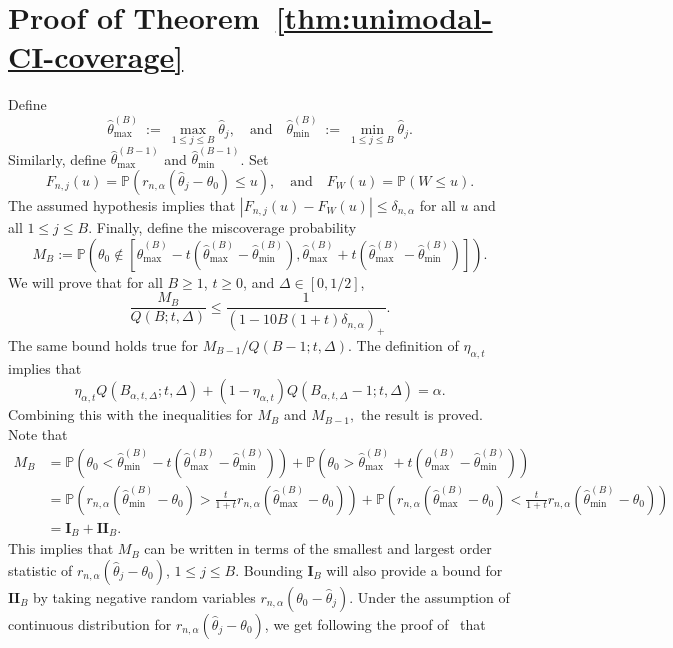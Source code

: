 \documentclass{article}
\numberwithin{myalgctr}{section}
\begin{document}
\section{Proof of Theorem~\ref{thm:unimodal-CI-coverage}}\label{appsec:unimodal-CI-coverage}
Define
\[
\widehat{\theta}_{\max}^{(B)} ~:=~ \max_{1\le j\le B}\widehat{\theta}_j,\quad\mbox{and}\quad \widehat{\theta}_{\min}^{(B)} ~:=~ \min_{1\le j\le B}\widehat{\theta}_j.
\]
Similarly, define $\widehat{\theta}_{\max}^{(B-1)}$ and $\widehat{\theta}_{\min}^{(B-1)}$.
Set
\[
F_{n,j}(u) = \mathbb{P}(r_{n,\alpha}(\widehat{\theta}_j - \theta_0) \le u),\quad\mbox{and}\quad F_W(u) = \mathbb{P}(W \le u).
\]
The assumed hypothesis implies that $|F_{n,j}(u) - F_W(u)| \le \delta_{n,\alpha}$ for all $u$ and all $1\le j\le B$. Finally, define the miscoverage probability
\[
M_B := \mathbb{P}\left(\theta_0 \notin \left[\widehat{\theta}_{\max}^{(B)} - t(\widehat{\theta}_{\max}^{(B)} - \widehat{\theta}_{\min}^{(B)}), \widehat{\theta}_{\max}^{(B)} + t(\widehat{\theta}_{\max}^{(B)} - \widehat{\theta}_{\min}^{(B)})\right]\right).
\]
We will prove that for all $B\ge1$, $t\ge0$, and $\Delta\in[0, 1/2]$,
\begin{equation}\label{eq:required-inequality-miscoverage-unimodal}
\frac{M_B}{Q(B; t, \Delta)} \le \frac{1}{(1 - 10B(1 + t)\delta_{n,\alpha})_+}.
\end{equation}
The same bound holds true for $M_{B-1}/Q(B-1;t, \Delta)$. The definition of $\eta_{\alpha,t}$ implies that $$\eta_{\alpha,t}Q(B_{\alpha,t,\Delta}; t, \Delta) + (1 - \eta_{\alpha,t})Q(B_{\alpha,t,\Delta}-1; t, \Delta) = \alpha.$$ Combining this with the inequalities for $M_B$ and $M_{B-1},$ the result is proved.
Note that
\begin{align*}
M_B &= \mathbb{P}(\theta_0 < \widehat{\theta}_{\min}^{(B)} - t (\widehat{\theta}_{\max}^{(B)} - \widehat{\theta}_{\min}^{(B)})) + \mathbb{P}(\theta_0 > \widehat{\theta}_{\max}^{(B)} + t (\widehat{\theta}_{\max}^{(B)} - \widehat{\theta}_{\min}^{(B)}))\\
&= \mathbb{P}\left(r_{n,\alpha}(\widehat{\theta}_{\min}^{(B)} - \theta_0) > \frac{t}{1+t}  r_{n,\alpha}(\widehat{\theta}_{\max}^{(B)} - \theta_0)\right) + \mathbb{P}\left(r_{n,\alpha}(\widehat{\theta}_{\max}^{(B)} - \theta_0) <  \frac{t}{1+t} r_{n,\alpha}(\widehat{\theta}_{\min}^{(B)} - \theta_0)\right)\\
&= \mathbf{I}_B + \mathbf{II}_B.
\end{align*}
This implies that $M_B$ can be written in terms of the smallest and largest order statistic of $r_{n,\alpha}(\widehat{\theta}_j - \theta_0)$, $1\le j\le B$. Bounding $\mathbf{I}_B$ will also provide a bound for $\mathbf{II}_B$ by taking negative random variables $r_{n,\alpha}(\theta_0 - \widehat{\theta}_j)$. Under the assumption of continuous distribution for $r_{n,\alpha}(\widehat{\theta}_j - \theta_0)$, we get following the proof of~\citet[Theorem 1]{lanke1974interval} that
\end{document}
